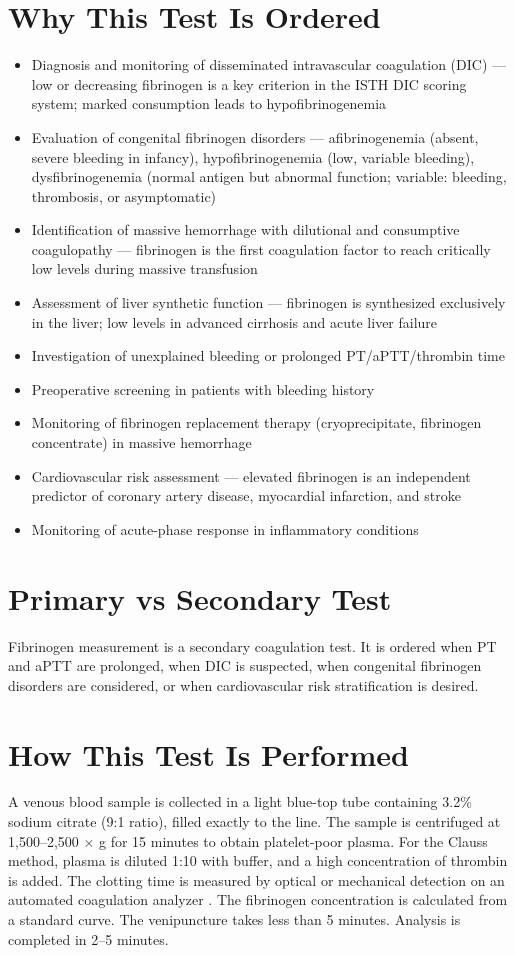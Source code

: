 \section*{Why This Test Is Ordered}
\begin{itemize}
  \item Diagnosis and monitoring of disseminated intravascular coagulation (DIC) --- low or decreasing fibrinogen is a key criterion in the ISTH DIC scoring system; marked consumption leads to hypofibrinogenemia \cite{taylor2001towards}
  \item Evaluation of congenital fibrinogen disorders --- afibrinogenemia (absent, severe bleeding in infancy), hypofibrinogenemia (low, variable bleeding), dysfibrinogenemia (normal antigen but abnormal function; variable: bleeding, thrombosis, or asymptomatic)
  \item Identification of massive hemorrhage with dilutional and consumptive coagulopathy --- fibrinogen is the first coagulation factor to reach critically low levels during massive transfusion
  \item Assessment of liver synthetic function --- fibrinogen is synthesized exclusively in the liver; low levels in advanced cirrhosis and acute liver failure
  \item Investigation of unexplained bleeding or prolonged PT/aPTT/thrombin time
  \item Preoperative screening in patients with bleeding history
  \item Monitoring of fibrinogen replacement therapy (cryoprecipitate, fibrinogen concentrate) in massive hemorrhage
  \item Cardiovascular risk assessment --- elevated fibrinogen is an independent predictor of coronary artery disease, myocardial infarction, and stroke
  \item Monitoring of acute-phase response in inflammatory conditions
\end{itemize}

\section*{Primary vs Secondary Test}
Fibrinogen measurement is a secondary coagulation test. It is ordered when PT and aPTT are prolonged, when DIC is suspected, when congenital fibrinogen disorders are considered, or when cardiovascular risk stratification is desired.

\section*{How This Test Is Performed}
A venous blood sample is collected in a light blue-top tube containing 3.2\% sodium citrate (9:1 ratio), filled exactly to the line. The sample is centrifuged at 1,500--2,500 $\times$ g for 15 minutes to obtain platelet-poor plasma. For the Clauss method, plasma is diluted 1:10 with buffer, and a high concentration of thrombin is added. The clotting time is measured by optical or mechanical detection on an automated coagulation analyzer \cite{fischbach2023manual}. The fibrinogen concentration is calculated from a standard curve. The venipuncture takes less than 5 minutes. Analysis is completed in 2--5 minutes.

